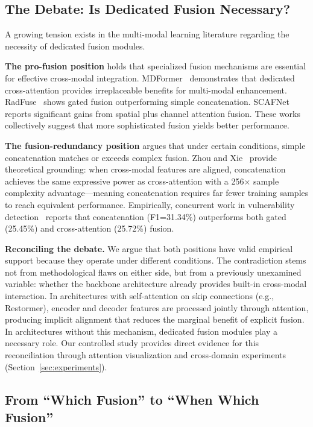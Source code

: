 \documentclass[pdflatex,sn-basic,Numbered]{sn-jnl}
\theoremstyle{thmstyleone}
\theoremstyle{thmstyletwo}
\theoremstyle{thmstylethree}
\begin{document}
\subsection{The Debate: Is Dedicated Fusion Necessary?}\label{sec:debate}

A growing tension exists in the multi-modal learning literature regarding the necessity of dedicated fusion modules.

\textbf{The pro-fusion position} holds that specialized fusion mechanisms are essential for effective cross-modal integration.
MDFormer~\cite{mdformer2025} demonstrates that dedicated cross-attention provides irreplaceable benefits for multi-modal enhancement.
RadFuse~\cite{radfuse2025} shows gated fusion outperforming simple concatenation.
SCAFNet~\cite{scafnet2025} reports significant gains from spatial plus channel attention fusion.
These works collectively suggest that more sophisticated fusion yields better performance.

\textbf{The fusion-redundancy position} argues that under certain conditions, simple concatenation matches or exceeds complex fusion.
Zhou and Xie~\cite{zhou2026feature} provide theoretical grounding: when cross-modal features are aligned, concatenation achieves the same expressive power as cross-attention with a 256$\times$ sample complexity advantage---meaning concatenation requires far fewer training samples to reach equivalent performance.
Empirically, concurrent work in vulnerability detection~\cite{vulnerability2025} reports that concatenation (F1=31.34\%) outperforms both gated (25.45\%) and cross-attention (25.72\%) fusion.

\textbf{Reconciling the debate.}
We argue that both positions have valid empirical support because they operate under different conditions.
The contradiction stems not from methodological flaws on either side, but from a previously unexamined variable: whether the backbone architecture already provides built-in cross-modal interaction.
In architectures with self-attention on skip connections (e.g., Restormer), encoder and decoder features are processed jointly through attention, producing implicit alignment that reduces the marginal benefit of explicit fusion.
In architectures without this mechanism, dedicated fusion modules play a necessary role.
Our controlled study provides direct evidence for this reconciliation through attention visualization and cross-domain experiments (Section~\ref{sec:experiments}).

\subsection{From ``Which Fusion'' to ``When Which Fusion''}
\end{document}
